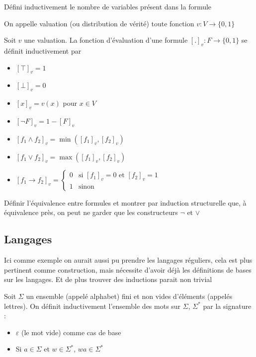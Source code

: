 \begin{exercise}
	Défini inductivement le nombre de variables présent dans la formule
\end{exercise}

\begin{definition}
	On appelle valuation (ou distribution de vérité) toute fonction $v : V \to \{0, 1\}$
\end{definition}

\begin{definition} Soit $v$ une valuation. La fonction d'évaluation d'une formule $[.]_v : F \to \{0,1\}$ se définit inductivement par \begin{itemize}[label=$\bullet$]
		\item $[\top]_v = 1$
		\item $[\bot]_v = 0$
		\item $[x]_v = v(x)$ pour $x \in V$
		\item $[\neg F]_v = 1 - [F]_v$
		\item $[f_1 \wedge f_2]_v = \min([f_1]_v, [f_2]_v)$
		\item $[f_1 \vee f_2]_v = \max([f_1]_v, [f_2]_v)$
		\item $[f_1 \to f_2]_v = \left\{ \begin{array}{ll}
			0 & \text{si } [f_1]_v = 0 \text{ et } [f_2]_v = 1\\
			1 & \text{sinon}
		\end{array} \right.$
\end{itemize}
\end{definition}

\begin{exercise}
	Définir l'équivalence entre formules et montrer par induction structurelle que, à équivalence près, on peut ne garder que les constructeurs $\neg$ et $\vee$
\end{exercise}

\subsection{Langages}

\begin{com}
	Ici comme exemple on aurait aussi pu prendre les langages réguliers, cela est plus pertinent comme construction, mais nécessite d'avoir déjà les définitions de bases sur les langages. Et de plus trouver des inductions parait non trivial
\end{com}

\begin{definition}
	Soit $\Sigma$ un ensemble (appelé alphabet) fini et non vides d'éléments (appelés lettres). On définit inductivement l'ensemble des mots sur $\Sigma$, $\Sigma^*$ par la signature : \begin{itemize}
		\item $\varepsilon$ (le mot vide) comme cas de base
		\item Si $a \in \Sigma$ et $w \in \Sigma^*$, $wa\in \Sigma^*$
	\end{itemize}
\end{definition}

